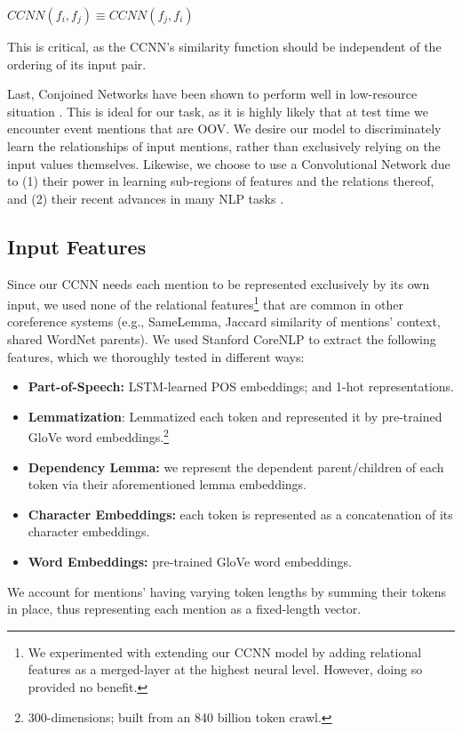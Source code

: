 \documentclass[11pt,a4paper]{article}
\begin{document}
\vspace{4mm}

 $CCNN(f_i,f_j) \equiv CCNN(f_j,f_i)$

\vspace{4mm}

This is critical, as the CCNN's similarity function should be independent of the ordering of its input pair.

Last, Conjoined Networks have been shown to perform well in low-resource situation \cite{Koch2015SiameseNN}.  This is ideal for our task, as it is highly likely that at test time we encounter event mentions that are OOV.  We desire our model to discriminately learn the relationships of input mentions, rather than exclusively relying on the input values themselves.  Likewise, we choose to use a Convolutional Network due to (1) their power in learning sub-regions of features and the relations thereof, and (2) their recent advances in many NLP tasks \cite{DBLP:conf/emnlp/Kim14,DBLP:conf/acl/GehringAGD17,DBLP:journals/corr/YuV17}.

\subsection{Input Features}
\label{sec:features}
Since our CCNN needs each mention to be represented exclusively by its own input, we used none of the relational features\footnote{We experimented with extending our CCNN model by adding relational features as a merged-layer at the highest neural level.  However, doing so provided no benefit.} that are common in other coreference systems (e.g., SameLemma, Jaccard similarity of mentions' context, shared WordNet parents).  We used Stanford CoreNLP \cite{manning-EtAl:2014:P14-5} to extract the following features, which we thoroughly tested in different ways: %
\begin{itemize}
  \item \textbf{Part-of-Speech:} LSTM-learned POS embeddings; and 1-hot representations.
  \item \textbf{Lemmatization}: Lemmatized each token and represented it by pre-trained GloVe \cite{pennington2014glove} word embeddings.\footnote{300-dimensions; built from an 840 billion token crawl.}
  \item \textbf{Dependency Lemma:} we represent the dependent parent/children of each token via their aforementioned lemma embeddings.
  \item \textbf{Character Embeddings:} each token is represented as a concatenation of its character embeddings.
  \item \textbf{Word Embeddings:} pre-trained GloVe word embeddings.
\end{itemize}
We account for mentions' having varying token lengths by summing their tokens in place, thus representing each mention as a fixed-length vector.
\end{document}
